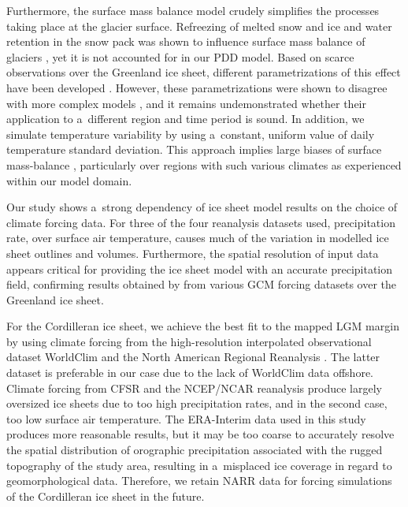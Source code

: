 \documentclass[tc, ms]{copernicus}
\begin{document}
Furthermore, the surface mass balance model crudely simplifies the processes taking place at the glacier surface. Refreezing of melted snow and ice and water retention in the snow pack was shown to influence surface mass balance of glaciers \citep{trabant-mayo-1985}, yet it is not accounted for in our PDD model. Based on scarce observations over the Greenland ice sheet, different parametrizations of this effect have been developed \citep{janssens-huybrechts-2000,fausto-etal-2009b}. However, these parametrizations were shown to disagree with more complex models \citep{reijmer-etal-2012}, and it remains undemonstrated whether their application to a~different region and time period is sound. In addition, we simulate temperature variability by using a~constant, uniform value of daily temperature standard deviation. This approach implies large biases of surface mass-balance \citep{charbit-etal-2013,rau-rogozhina-2013,seguinot-2013}, particularly over regions with such various climates as experienced within our model domain.

\conclusions
\label{sec:concl}

Our study shows a~strong dependency of ice sheet model results on the choice of climate forcing data. For three of the four reanalysis datasets used, precipitation rate, over surface air temperature, causes much of the variation in modelled ice sheet outlines and volumes. Furthermore, the spatial resolution of input data appears critical for providing the ice sheet model with an accurate precipitation field, confirming results obtained by \citet{quiquet-etal-2012} from various GCM forcing datasets over the Greenland ice sheet.

For the Cordilleran ice sheet, we achieve the best fit to the mapped LGM margin by \citet{dyke-2004} using climate forcing from the high-resolution interpolated observational dataset WorldClim \citep{data:worldclim} and the North American Regional Reanalysis \citep[NARR;][]{data:narr}. The latter dataset is preferable in our case due to the lack of WorldClim data offshore. Climate forcing from CFSR and the NCEP/NCAR reanalysis produce largely oversized ice sheets due to too high precipitation rates, and in the second case, too low surface air temperature. The ERA-Interim data used in this study produces more reasonable results, but it may be too coarse to accurately resolve the spatial distribution of orographic precipitation associated with the rugged topography of the study area, resulting in a~misplaced ice coverage in regard to geomorphological data. Therefore, we retain NARR data for forcing simulations of the Cordilleran ice sheet in the future.
\end{document}
